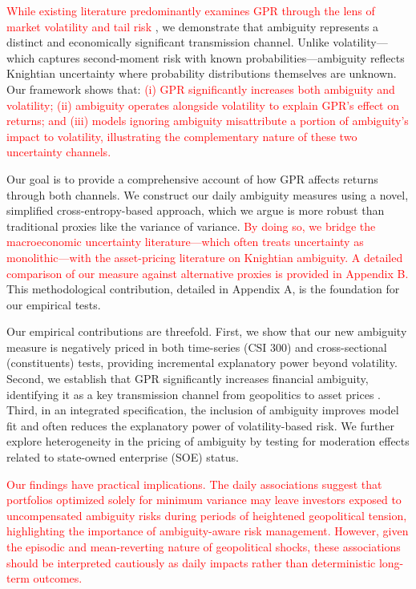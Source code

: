 \documentclass[preprint,12pt,authoryear]{elsarticle}
\begin{document}
\textcolor{red}{While existing literature predominantly examines GPR through the lens of market volatility \citep{Liu2024} and tail risk \citep{Salisu2021}}, we demonstrate that ambiguity represents a distinct and economically significant transmission channel. Unlike volatility---which captures second-moment risk with known probabilities---ambiguity reflects Knightian uncertainty where probability distributions themselves are unknown. Our framework shows that: \textcolor{red}{(i) GPR significantly increases both ambiguity and volatility; (ii) ambiguity operates alongside volatility to explain GPR's effect on returns; and (iii) models ignoring ambiguity misattribute a portion of ambiguity's impact to volatility, illustrating the complementary nature of these two uncertainty channels.}

Our goal is to provide a comprehensive account of how GPR affects returns through both channels. We construct our daily ambiguity measures using a novel, simplified cross-entropy-based approach, which we argue is more robust than traditional proxies like the variance of variance. \textcolor{red}{By doing so, we bridge the macroeconomic uncertainty literature---which often treats uncertainty as monolithic---with the asset-pricing literature on Knightian ambiguity. A detailed comparison of our measure against alternative proxies is provided in Appendix B.} This methodological contribution, detailed in Appendix A, is the foundation for our empirical tests.

Our empirical contributions are threefold. First, we show that our new ambiguity measure is negatively priced in both time-series (CSI 300) and cross-sectional (constituents) tests, providing incremental explanatory power beyond volatility. Second, we establish that GPR significantly increases financial ambiguity, identifying it as a key transmission channel from geopolitics to asset prices \citep{Caldara2022}. Third, in an integrated specification, the inclusion of ambiguity improves model fit and often reduces the explanatory power of volatility-based risk. We further explore heterogeneity in the pricing of ambiguity by testing for moderation effects related to state-owned enterprise (SOE) status.

\textcolor{red}{Our findings have practical implications. The daily associations suggest that portfolios optimized solely for minimum variance may leave investors exposed to uncompensated ambiguity risks during periods of heightened geopolitical tension, highlighting the importance of ambiguity-aware risk management. However, given the episodic and mean-reverting nature of geopolitical shocks, these associations should be interpreted cautiously as daily impacts rather than deterministic long-term outcomes.}
\end{document}
